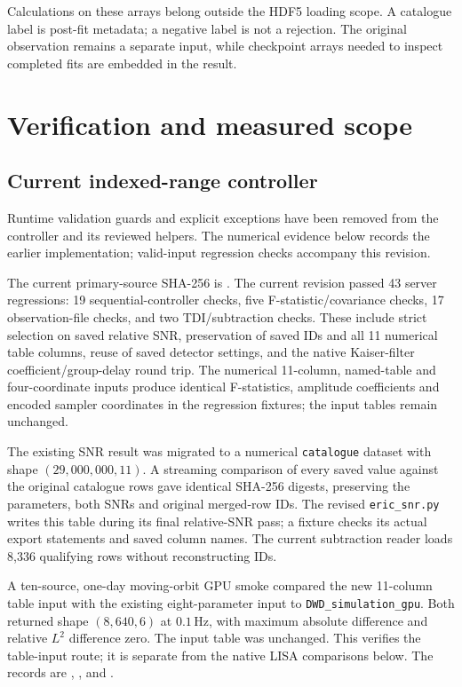 \documentclass[11pt,a4paper]{article}
\newcommand{\code}[1]{\texttt{\nolinkurl{#1}}}
\newcommand{\Hz}{\,\mathrm{Hz}}
\begin{document}
Calculations on these arrays belong outside the HDF5 loading scope.
A catalogue label is post-fit metadata; a negative label is not a rejection.
The original observation remains a separate input, while checkpoint arrays
needed to inspect completed fits are embedded in the result.

\section{Verification and measured scope}
\label{sec:verification}
\label{sec:tdi_api_validation}

\subsection{Current indexed-range controller}

Runtime validation guards and explicit exceptions have been removed from the
controller and its reviewed helpers. The numerical evidence below records the
earlier implementation; valid-input regression checks accompany this revision.

The current primary-source SHA-256 is
.
The current revision passed 43 server regressions: 19 sequential-controller
checks, five F-statistic/covariance checks, 17 observation-file checks, and two
TDI/subtraction checks. These include strict selection on saved relative SNR,
preservation of saved IDs and all 11 numerical table columns, reuse of saved
detector settings, and the native Kaiser-filter coefficient/group-delay round trip.
The numerical 11-column, named-table and four-coordinate inputs produce identical F-statistics,
amplitude coefficients and encoded sampler coordinates in the regression
fixtures; the input tables remain unchanged.

The existing SNR result was migrated to a numerical \code{catalogue} dataset
with shape \((29{,}000{,}000,11)\). A streaming comparison of every saved value
against the original catalogue rows gave identical SHA-256 digests, preserving
the parameters, both SNRs and original merged-row IDs. The revised
\code{eric_snr.py} writes this table during its final relative-SNR pass; a
fixture checks its actual export statements and saved column names. The current
subtraction reader loads 8,336 qualifying rows without reconstructing IDs.

A ten-source, one-day moving-orbit GPU smoke compared the new 11-column table
input with the existing eight-parameter input to \code{DWD_simulation_gpu}.
Both returned shape \((8{,}640,6)\) at \(0.1\Hz\), with maximum absolute
difference and relative \(L^2\) difference zero. The input table was unchanged.
This verifies the table-input route; it is separate from the native LISA
comparisons below. The records are
,
, and
.
\end{document}
